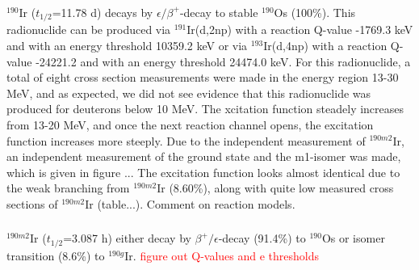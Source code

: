\documentclass[a4paper,11pt,twoside]{book}
\begin{document}
\subsubsection{}
$^{190}$Ir ($t_{1/2}$=11.78 d) decays by $\epsilon/\beta^+$-decay to stable $^{190}$Os (100\%). This radionuclide can be produced via $^{191}$Ir(d,2np) with a reaction Q-value -1769.3 keV and with an energy threshold 10359.2 keV or via $^{193}$Ir(d,4np) with a reaction Q-value -24221.2 and with an energy threshold 24474.0 keV. For this radionuclide, a total of eight cross section measurements were made in the energy region 13-30 MeV, and as expected, we did not see evidence that this radionuclide was produced for deuterons below 10 MeV. The xcitation function steadely increases from 13-20 MeV, and once the next reaction channel opens, the excitation function increases more steeply. Due to the independent measurement of $^{190m2}$Ir, an independent measurement of the ground state and the m1-isomer was made, which is given in figure ... The excitation function looks almost identical due to the weak branching from $^{190m2}$Ir (8.60\%), along with quite low measured cross sections of $^{190m2}$Ir (table...). Comment on reaction models. 

\subsubsection{}
$^{190m2}$Ir ($t_{1/2}$=3.087 h) either decay by $\beta^+/\epsilon$-decay (91.4\%) to $^{190}$Os or isomer transition (8.6\%) to $^{190g}$Ir. \textcolor{red}{figure out Q-values and e thresholds}
\end{document}
